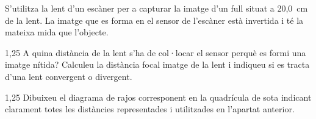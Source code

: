S'utilitza la lent d'un escàner per a capturar la imatge d'un full situat a 20,0~cm de la lent. La imatge que es forma en el sensor de l'escàner està invertida i té la mateixa mida que l'objecte.

\begin{apartat}{1,25}
A quina distància de la lent s'ha de col·locar el sensor perquè es formi una imatge nítida? Calculeu la distància focal imatge de la lent i indiqueu si es tracta d'una lent convergent o divergent.
\end{apartat}

\begin{apartat}{1,25}
Dibuixeu el diagrama de rajos corresponent en la quadrícula de sota indicant clarament totes les distàncies representades i utilitzades en l'apartat anterior.
\end{apartat}

